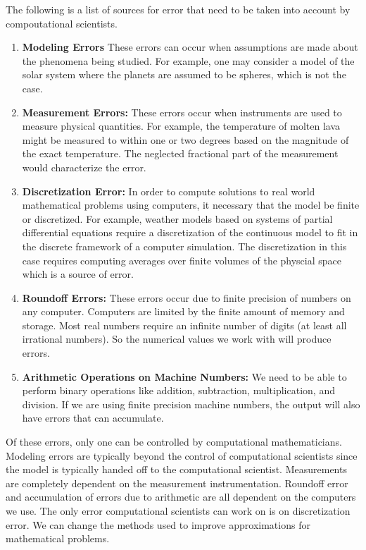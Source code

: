 \documentclass[10pt,fleqn]{article}
\begin{document}
The following is a list of sources for error that need to be taken into account
by compoutational scientists.
\begin{enumerate}
  \item {\bf Modeling Errors} These errors can occur when assumptions are made
        about the phenomena being studied. For example, one may consider a model
        of the solar system where the planets are assumed to be spheres, which
        is not the case.
  \item {\bf Measurement Errors:} These errors occur when instruments are used
        to measure physical quantities. For example, the temperature of molten
        lava might be measured to within one or two degrees based on the
        magnitude of the exact temperature. The neglected fractional part of
        the measurement would characterize the error.
  \item {\bf Discretization Error:} In order to compute solutions to real world
        mathematical problems using computers, it necessary that the model be
        finite or discretized. For example, weather models based on systems of
        partial differential equations require a discretization of the
        continuous model to fit in the discrete framework of a computer
        simulation. The discretization in this case requires computing averages
        over finite volumes of the physcial space which is a source of error.
  \item {\bf Roundoff Errors:} These errors occur due to finite precision of
        numbers on any computer. Computers are limited by the finite amount of
        memory and storage. Most real numbers require an infinite number of
        digits (at least all irrational numbers). So the numerical values we
        work with will produce errors.
  \item {\bf Arithmetic Operations on Machine Numbers:} We need to be able to
        perform binary operations like addition, subtraction, multiplication,
        and division. If we are using finite precision machine numbers, the
        output will also have errors that can accumulate.
\end{enumerate}
Of these errors, only one can be controlled by computational mathematicians.
Modeling errors are typically beyond the control of computational scientists
since the model is typically handed off to the computational scientist.
Measurements are completely dependent on the measurement instrumentation.
Roundoff error and accumulation of errors due to arithmetic are all dependent
on the computers we use. The only error computational scientists can work on is
on discretization error. We can change the methods used to improve
approximations for mathematical problems.
\end{document}
